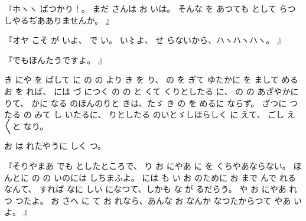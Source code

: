 『ホヽヽ
ばつかり！。
まだ
さんは
お
いは。
そんな
を
あつても
として
らつしやるぢあありませんか。
』

『オヤ
こそ
が
いよ、
で
い。
い〻よ、%
せ
らないから、ハヽハヽハヽ。
』

『でもほんたうですよ。
』

き
にや
を
ばして
に
の
の
より
き
を
り、
の
を
ぎて
ゆたかに
を
まして
める
お
を
れば、
には
づ
につく
の
の
と
くて
くりとしたる
に、
の
の
あざやかに
りて、
かに
なる
のほんのりと
きは、たゞ
き
の
を
めるに
ならず。
ざつに
つたる
の
みて
し
いたるに、
りとしたる
のいとゞしほらしく
に
えて、
ごし
え〳〵と
なり。

お
は
れたやうに
しく
つ。

『そりやまあ
でも
としたところで、
り
お
にやあ
に
を
くちやあならない。
ほんとに
の
の
いのには
しちまふよ。
には
も
い
お
のために
お
まで
んで
れるなんて、
すれば
なに
しい
になつて、しかも
な
が
るだらう。
や
お
にやあ
れつ
つたよ。
お
さへ
に
て
お
れなら、あんな
お
なんか
なつたからつて
やあ
いよ。
』

